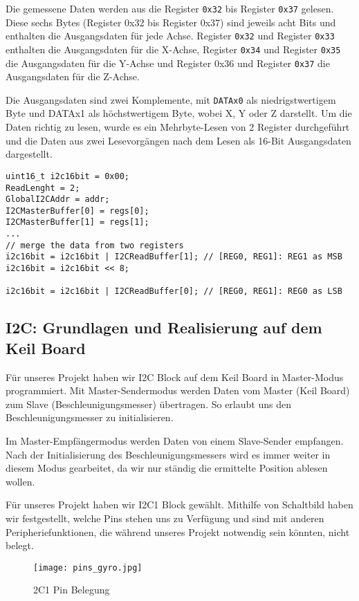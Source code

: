 Die gemessene Daten werden aus die Register \texttt{0x32} bis Register \texttt{0x37} gelesen. Diese sechs Bytes (Register 0x32 bis Register 0x37) sind jeweils acht Bits und enthalten die Ausgangsdaten für jede Achse. Register \texttt{0x32} und Register \texttt{0x33} enthalten die Ausgangsdaten für die X-Achse, Register \texttt{0x34} und Register \texttt{0x35} die Ausgangsdaten für die Y-Achse und Register 0x36 und Register \texttt{0x37} die Ausgangsdaten für die Z-Achse. 

Die Ausgangsdaten sind zwei Komplemente, mit \texttt{DATAx0} als niedrigstwertigem Byte und DATAx1 als höchstwertigem Byte, wobei X, Y oder Z darstellt. Um die Daten richtig zu lesen, wurde es ein Mehrbyte-Lesen von 2 Register durchgeführt und die Daten aus zwei Lesevorgängen nach dem Lesen als 16-Bit Ausgangsdaten dargestellt. 

\begin{lstlisting}
uint16_t i2c16bit = 0x00;
ReadLenght = 2;
GlobalI2CAddr = addr;
I2CMasterBuffer[0] = regs[0];
I2CMasterBuffer[1] = regs[1];
...
// merge the data from two registers
i2c16bit = i2c16bit | I2CReadBuffer[1]; // [REG0, REG1]: REG1 as MSB
i2c16bit = i2c16bit << 8;

i2c16bit = i2c16bit | I2CReadBuffer[0]; // [REG0, REG1]: REG0 as LSB

\end{lstlisting}

\subsection{I2C: Grundlagen und Realisierung auf dem Keil Board}
Für unseres Projekt haben wir I2C Block auf dem Keil Board in Master-Modus programmiert. Mit Master-Sendermodus werden Daten vom Master (Keil Board) zum Slave (Beschleunigungsmesser) übertragen. So erlaubt uns den Beschleunigungsmesser zu initialisieren. 

Im Master-Empfängermodus werden Daten von einem Slave-Sender empfangen. Nach der Initialisierung des Beschleunigungsmessers wird es immer weiter in diesem Modus gearbeitet, da wir nur ständig die ermittelte Position ablesen wollen. 

Für unseres Projekt haben wir I2C1 Block gewählt. Mithilfe von Schaltbild haben wir festgestellt, welche Pins stehen uns zu Verfügung und sind mit anderen Peripheriefunktionen, die während unseres Projekt notwendig sein könnten, nicht belegt. 

\begin{figure}[!hb]
	\centering
	\texttt{[image: pins\_gyro.jpg]}
	\caption[I2C1 Pin Belegung]{2C1 Pin Belegung}
	\label{fig:i2cpins}
\end{figure}

